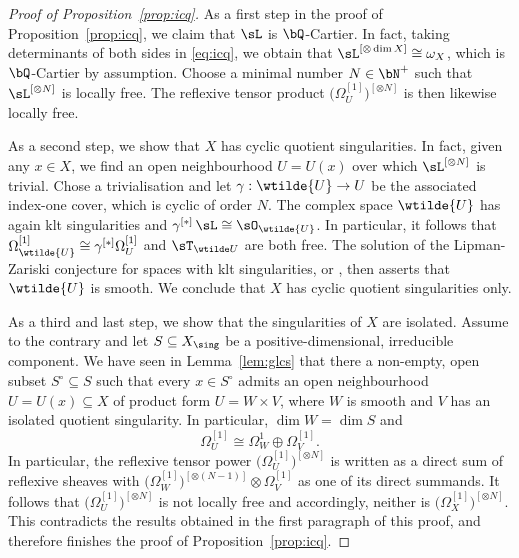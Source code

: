 \begin{proof}[Proof of Proposition~\ref{prop:icq}]
As a first step in the proof of Proposition~\ref{prop:icq}, we claim that $\sL$
is $\bQ$-Cartier. In fact, taking determinants of both sides in \eqref{eq:icq},
we obtain that $\sL^{[\otimes \dim X]} \cong \omega_X$, which is $\bQ$-Cartier by assumption.
Choose a minimal number $N \in \bN^+$ such that $\sL^{[\otimes N]}$ is locally free. The
reflexive tensor product $\bigl(\Omega^{[1]}_U \bigr)^{[\otimes N]}$ is then likewise
locally free.

As a second step, we show that $X$ has cyclic quotient singularities. In
fact, given any $x \in X$, we find an open neighbourhood $U=U(x)$ over which
$\sL^{[\otimes N]}$ is trivial. Chose a trivialisation and let $\gamma: \wtilde{U} \to U$ be
the associated index-one cover, which is cyclic of order $N$. The complex
space $\wtilde{U}$ has again klt singularities and
$\gamma^{[*]}\, \sL \cong\nobreak \sO_{\wtilde{U}}$. In particular, it follows that
$\Omega^{[1]}_{\wtilde{U}} \cong \gamma^{[*]} \Omega^{[1]}_U$ and $\sT_{\wtilde U}$ are both free.
The solution of the Lipman-Zariski conjecture for spaces with klt
singularities, \cite[Th.\,3.8 \& comments after Th.\,1.1]{Druel13a} or
\cite[Th.\,1.13]{KS18}, then asserts that $\wtilde{U}$ is smooth. We conclude
that $X$ has cyclic quotient singularities only.

As a third and last step, we show that the singularities of $X$ are isolated.
Assume to the contrary and let $S \subseteq X_{\sing}$ be a positive-dimensional,
irreducible component. We have seen in Lemma~\ref{lem:glcs} that there a
non-empty, open subset $S^\circ \subseteq S$ such that every $x \in S^\circ$ admits an open
neighbourhood $U = U(x) \subseteq X$ of product form $U = W \times V$, where $W$ is smooth
and $V$ has an isolated quotient singularity. In particular,
$\dim W = \dim S$ and
\[
\Omega^{[1]}_U \cong \Omega^1_W \oplus \Omega^{[1]}_V.
\]
In particular, the reflexive tensor power $\bigl(\Omega^{[1]}_U \bigr)^{[\otimes N]}$ is
written as a direct sum of reflexive sheaves with
$\bigl(\Omega^{[1]}_W \bigr)^{[\otimes (N-1)]} \otimes \Omega^{[1]}_V$ as one of its direct
summands. It follows that $\bigl(\Omega^{[1]}_U \bigr)^{[\otimes N]}$ is not locally
free and accordingly, neither is $\bigl(\Omega^{[1]}_X \bigr)^{[\otimes N]}$. This
contradicts the results obtained in the first paragraph of this proof, and
therefore finishes the proof of Proposition~\ref{prop:icq}.
\end{proof}

